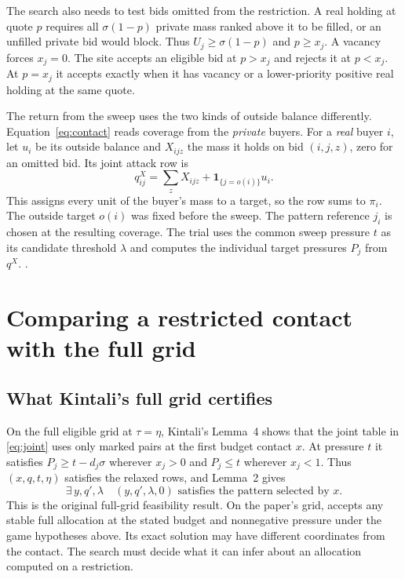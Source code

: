 \documentclass[11pt,letterpaper]{article}
\newcommand{\code}[1]{\textnormal{\texttt{\detokenize{#1}}}}
\newcommand{\baseurl}{https://github.com/robbiemu/bayesian-simple-security-games/blob/75bc25c2ddfac1813064434a3165b3ddd1a1f63d}
\newcommand{\decl}[3]{\href{\baseurl/lean/#1.lean\#L#2}{\code{#3}}}
\begin{document}
The search also needs to test bids omitted from the restriction.
A real holding at quote $p$ requires all $\sigma(1-p)$ private mass
ranked above it to be filled, or an unfilled private bid would block.
Thus $U_j\ge\sigma(1-p)$ and $p\ge x_j$. A vacancy forces $x_j=0$.
The site accepts an eligible bid at $p>x_j$
and rejects it at $p<x_j$. At $p=x_j$ it accepts exactly when it has
vacancy or a lower-priority positive real holding at the same quote.
\cite[\S2, (4)]{kintali}

The return from the sweep uses the two kinds of outside balance differently.
Equation~\eqref{eq:contact} reads coverage from the \emph{private} buyers.
For a \emph{real} buyer $i$, let $u_i$ be its outside balance and $X_{ijz}$
the mass it holds on bid $(i,j,z)$, zero for an omitted bid. Its joint
attack row is
\begin{equation}
 q^X_{ij}=\sum_z X_{ijz}+\mathbf 1_{\{j=o(i)\}}u_i .
 \label{eq:joint}
\end{equation}
This assigns every unit of the buyer's mass to a target, so the row sums
to $\pi_i$. The outside target $o(i)$ was fixed before the sweep. The
pattern reference $j_i$ is chosen at the resulting coverage. The trial
uses the common sweep pressure $t$ as its candidate threshold $\lambda$
and computes the individual target pressures $P_j$ from $q^X$.
\decl{Kintali/ExactRecovery/Contact}{106}{Holdings.joint}.

\section{Comparing a restricted contact with the full grid}
\label{sec:comparison}

\subsection{What Kintali's full grid certifies}

On the full eligible grid at $\tau=\eta$, Kintali's Lemma~4 shows that
the joint table in \eqref{eq:joint} uses only marked pairs at
the first budget contact $x$. At pressure $t$ it satisfies
$P_j\ge t-d_j\sigma$ wherever $x_j>0$ and $P_j\le t$ wherever $x_j<1$.
Thus $(x,q,t,\eta)$ satisfies the relaxed rows, and Lemma~2 gives
\begin{equation}
       \exists\,y,q',\lambda\quad
       (y,q',\lambda,0)\text{ satisfies the pattern selected by }x.
       \label{eq:full}
\end{equation}
This is the original full-grid feasibility result. On the paper's grid,
\decl{Kintali/ExactRecovery/FullMarket}{23}{Expanded.full_pattern_exact}
accepts any stable full allocation at the stated budget and nonnegative
pressure under the game hypotheses above. Its exact solution may have
different coordinates from the contact. The search must decide what it can
infer about an allocation computed on a restriction. \cite[Lemma~4]{kintali}
\end{document}
